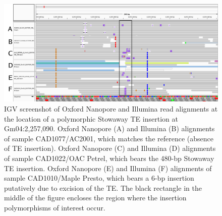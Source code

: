 \documentclass[12pt]{article}
\newenvironment{lsfigure}
	{\begin{landscape} \begin{figure} \centering}
	{\end{figure} \end{landscape}}
\begin{document}
\begin{lsfigure}
	\includegraphics[width = 9.5in]{Gm04_2257090_annotated}

	\caption[IGV screenshot of Oxford Nanopore and Illumina read alignments at the location of a polymorphic Stowaway TE insertion]{
		IGV screenshot of Oxford Nanopore and Illumina read alignments at the location of a polymorphic Stowaway TE insertion at Gm04:2,257,090.
		Oxford Nanopore (A) and Illumina (B) alignments of sample CAD1077/AC2001, which matches the reference (absence of TE insertion).
		Oxford Nanopore (C) and Illumina (D) alignments of sample CAD1022/OAC Petrel, which bears the 480-bp Stowaway TE insertion.
		Oxford Nanopore (E) and Illumina (F) alignments of sample CAD1010/Maple Presto, which bears a 6-bp insertion putatively due to excision of the TE.
		The black rectangle in the middle of the figure encloses the region where the insertion polymorphisms of interest occur.
	}

	\label{fig_s20}

\end{lsfigure}

\clearpage%
\end{document}
